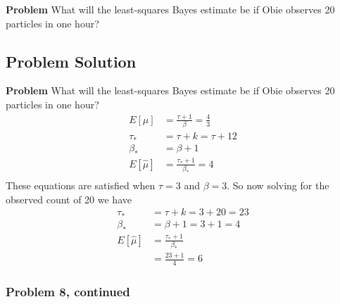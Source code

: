 \documentclass[12pt]{article}
\theoremstyle{definition}
\begin{document}
\bigskip
\noindent
{\bf Problem} What will the least-squares Bayes estimate be if Obie observes 20 particles in one hour?



\subsection*{Problem Solution}

\noindent
{\bf Problem} What will the least-squares Bayes estimate be if Obie observes 20 particles in one hour?
\begin{align*}
E[\mu] &= \frac{\tau + 1}{\beta} = \frac{4}{3}\\
\tau_* &= \tau + k = \tau + 12\\
\beta_* &= \beta + 1 \\
E[\hat{\mu}] &= \frac{\tau_* + 1}{\beta_*} = 4\\
\end{align*}
These equations are satisfied when $\tau = 3$ and $\beta = 3$. So now solving for the observed count of 20 we have
\begin{align*}
\tau_* &= \tau + k = 3 + 20 = 23\\
\beta_* &= \beta + 1 = 3 + 1 = 4\\
E[\hat{\mu}] &= \frac{\tau_* + 1}{\beta_*}\\
&= \frac{23 + 1}{4} = 6
\end{align*}

\newpage
\subsubsection*{Problem 8, continued}
\end{document}
